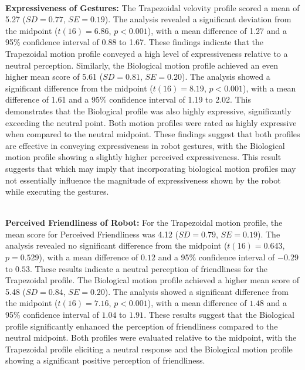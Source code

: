 \documentclass{CSSRforAfrica}
\begin{document}
\vspace{-2mm}
~\\
\noindent \textbf{Expressiveness of Gestures:}
The Trapezoidal velovity profile scored a mean of 5.27 ($SD = 0.77$, $SE = 0.19$). The analysis revealed a significant deviation from the midpoint ($t(16) = 6.86$, $p < 0.001$), with a mean difference of 1.27 and a 95\% confidence interval of 0.88 to 1.67. These findings indicate that the Trapezoidal motion profile conveyed a high level of expressiveness  relative to a neutral perception.
Similarly, the Biological motion profile achieved an even higher mean score of 5.61 ($SD = 0.81$, $SE = 0.20$). The analysis showed a significant difference from the midpoint ($t(16) = 8.19$, $p < 0.001$), with a mean difference of 1.61 and a 95\% confidence interval of 1.19 to 2.02. This demonstrates that the Biological profile was also highly expressive, significantly exceeding the neutral point.
Both motion profiles were rated as highly expressive when compared to the neutral midpoint. These findings suggest that both profiles are effective in conveying expressiveness in robot gestures, with the Biological motion profile showing a slightly higher perceived expressiveness. This result suggests that which may imply that incorporating biological motion profiles may not essentially influence the magnitude of expressiveness shown by the robot while executing the gestures.

 
~\\
\noindent \textbf{Perceived Friendliness of Robot:}
For the Trapezoidal motion profile, the mean score for Perceived Friendliness was 4.12 ($SD = 0.79$, $SE = 0.19$). The analysis revealed no significant difference from the midpoint ($t(16) = 0.643$, $p = 0.529$), with a mean difference of $0.12$ and a 95\% confidence interval of $-0.29$ to $0.53$. These results indicate a neutral perception of friendliness for the Trapezoidal profile.
The Biological motion profile achieved a higher mean score of 5.48 ($SD = 0.84$, $SE = 0.20$). The analysis showed a significant difference from the midpoint ($t(16) = 7.16$, $p < 0.001$), with a mean difference of $1.48$ and a 95\% confidence interval of $1.04$ to $1.91$. These results suggest that the Biological profile significantly enhanced the perception of friendliness compared to the neutral midpoint.
Both profiles were evaluated relative to the midpoint, with the Trapezoidal profile eliciting a neutral response and the Biological motion profile showing a significant positive perception of friendliness.
\end{document}
